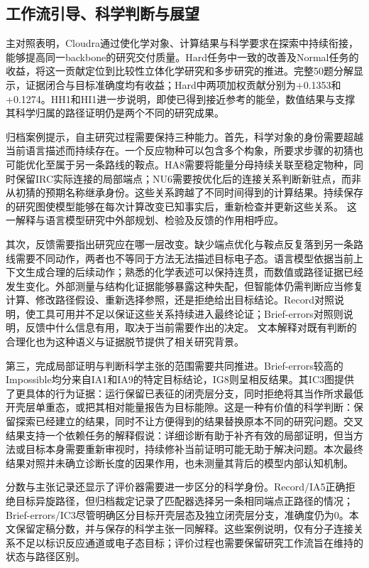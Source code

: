 \subsection{工作流引导、科学判断与展望}

主对照表明，Cloudra通过使化学对象、计算结果与科学要求在探索中持续衔接，能够提高同一backbone的研究交付质量。Hard任务中一致的改善及Normal任务的收益，将这一贡献定位到比较性立体化学研究和多步研究的推进。完整50题分解显示，证据闭合与目标准确度均有收益；Hard中两项加权贡献分别为+0.1353和+0.1274。HH1和HI1进一步说明，即使已得到接近参考的能垒，数值结果与支撑其科学归属的路径证明仍是两个不同的研究成果。

归档案例提示，自主研究过程需要保持三种能力。首先，科学对象的身份需要超越当前语言描述而持续存在。一个反应物种可以包含多个构象，所要求步骤的初猜也可能优化至属于另一条路线的鞍点。HA8需要将能量分母持续关联至稳定物种，同时保留IRC实际连接的局部端点；NU6需要按优化后的连接关系判断新驻点，而非从初猜的预期名称继承身份。这些关系跨越了不同时间得到的计算结果。持续保存的研究图使模型能够在每次计算改变已知事实后，重新检查并更新这些关系。 这一解释与语言模型研究中外部规划、检验及反馈的作用相呼应。

其次，反馈需要指出研究应在哪一层改变。缺少端点优化与鞍点反复落到另一条路线需要不同动作，两者也不等同于方法无法描述目标电子态。语言模型依据当前上下文生成合理的后续动作；熟悉的化学表述可以保持连贯，而数值或路径证据已经发生变化。外部测量与结构化证据能够暴露这种失配，但智能体仍需判断应当修复计算、修改路径假设、重新选择参照，还是拒绝给出目标结论。Record对照说明，使工具可用并不足以保证这些关系持续进入最终论证；Brief-errors对照则说明，反馈中什么信息有用，取决于当前需要作出的决定。 文本解释对既有判断的合理化也为这种语义与证据脱节提供了相关研究背景。

第三，完成局部证明与判断科学主张的范围需要共同推进。Brief-errors较高的Impossible均分来自IA1和IA9的特定目标结论，IG8则呈相反结果。其IC3图提供了更具体的行为证据：运行保留已表征的闭壳层分支，同时拒绝将其当作所求最低开壳层单重态，或把其相对能量报告为目标能隙。这是一种有价值的科学判断：保留探索已经建立的结果，同时不让方便得到的结果替换原本不同的研究问题。交叉结果支持一个依赖任务的解释假说：详细诊断有助于补齐有效的局部证明，但当方法或目标本身需要重新审视时，持续修补当前证明可能无助于解决问题。本次最终结果对照并未确立诊断长度的因果作用，也未测量其背后的模型内部认知机制。

分数与主张记录还显示了评价器需要进一步区分的科学身份。Record/IA5正确拒绝目标异旋路径，但归档裁定记录了匹配器选择另一条相同端点正路径的情况；Brief-errors/IC3尽管明确区分目标开壳层态及独立闭壳层分支，准确度仍为0。本文保留定稿分数，并与保存的科学主张一同解释。这些案例说明，仅有分子连接关系不足以标识反应通道或电子态目标；评价过程也需要保留研究工作流旨在维持的状态与路径区别。

